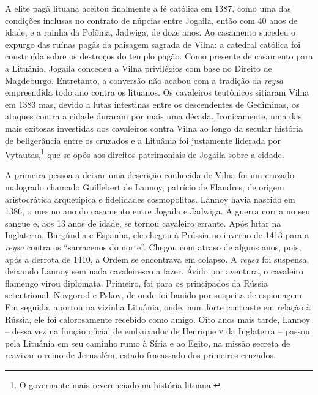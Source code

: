 A elite pagã lituana aceitou finalmente a fé católica em 1387, como uma
das condições inclusas no contrato de núpcias entre Jogaila, então com
40 anos de idade, e a rainha da Polônia, Jadwiga, de doze anos. Ao
casamento sucedeu o expurgo das ruínas pagãs da paisagem sagrada de
Vilna: a catedral católica foi construída sobre os destroços do templo
pagão. Como presente de casamento para a Lituânia, Jogaila concedeu a
Vilna privilégios com base no Direito de Magdeburgo. Entretanto, a
conversão não acabou com a tradição da \textit{reysa} empreendida todo ano
contra os lituanos. Os cavaleiros teutônicos sitiaram Vilna em 1383 mas,
devido a lutas intestinas entre os descendentes de Gediminas, os ataques
contra a cidade duraram por mais uma década. Ironicamente, uma das mais
exitosas investidas dos cavaleiros contra Vilna ao longo da secular
história de beligerância entre os cruzados e a Lituânia foi justamente
liderada por Vytautas,\footnote{O governante mais reverenciado na história
lituana.} que se opôs aos direitos patrimoniais de Jogaila sobre a
cidade.

A primeira pessoa a deixar uma descrição conhecida de Vilna foi um
cruzado malogrado chamado Guillebert de Lannoy, patrício de Flandres, de
origem aristocrática arquetípica e fidelidades cosmopolitas. Lannoy
havia nascido em 1386, o mesmo ano do casamento entre Jogaila e Jadwiga.
A guerra corria no seu sangue e, aos 13 anos de idade, se tornou
cavaleiro errante. Após lutar na Inglaterra, Burgúndia e Espanha, ele
chegou à Prússia no inverno de 1413 para a \textit{reysa} contra os
``sarracenos do norte''. Chegou com atraso de alguns anos, pois, após a
derrota de 1410, a Ordem se encontrava em colapso. A \textit{reysa} foi
suspensa, deixando Lannoy sem nada cavaleiresco a fazer. Ávido por
aventura, o cavaleiro flamengo virou diplomata. Primeiro, foi para os
principados da Rússia setentrional, Novgorod e Pskov, de onde foi banido
por suspeita de espionagem. Em seguida, aportou na vizinha Lituânia,
onde, num forte contraste em relação à Rússia, ele foi calorosamente
recebido como amigo. Oito anos mais tarde, Lannoy -- dessa vez na função
oficial de embaixador de Henrique \textsc{v} da Inglaterra -- passou pela Lituânia
em seu caminho rumo à Síria e ao Egito, na missão secreta de reavivar o
reino de Jerusalém, estado fracassado dos primeiros cruzados.

